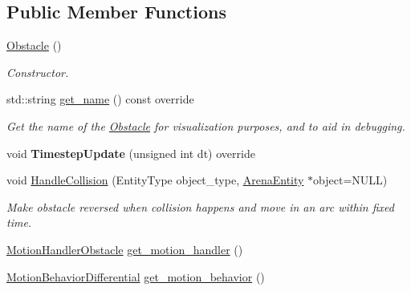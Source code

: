 \subsection*{Public Member Functions}
\begin{DoxyCompactItemize}
\item 
\hyperlink{classObstacle_a8f734072321fa06a7b7dae2d5f50f352}{Obstacle} ()\hypertarget{classObstacle_a8f734072321fa06a7b7dae2d5f50f352}{}\label{classObstacle_a8f734072321fa06a7b7dae2d5f50f352}

\begin{DoxyCompactList}\small\item\em Constructor. \end{DoxyCompactList}\item 
std\+::string \hyperlink{classObstacle_a4642d3f61b6e74fd5a9c91bb263dfe18}{get\+\_\+name} () const override\hypertarget{classObstacle_a4642d3f61b6e74fd5a9c91bb263dfe18}{}\label{classObstacle_a4642d3f61b6e74fd5a9c91bb263dfe18}

\begin{DoxyCompactList}\small\item\em Get the name of the \hyperlink{classObstacle}{Obstacle} for visualization purposes, and to aid in debugging. \end{DoxyCompactList}\item 
void {\bfseries Timestep\+Update} (unsigned int dt) override\hypertarget{classObstacle_adda549c77a5a67aa5423cb0f84b986df}{}\label{classObstacle_adda549c77a5a67aa5423cb0f84b986df}

\item 
void \hyperlink{classObstacle_aa4e6d051a5fe8024d59425737baa381f}{Handle\+Collision} (Entity\+Type object\+\_\+type, \hyperlink{classArenaEntity}{Arena\+Entity} $\ast$object=N\+U\+LL)\hypertarget{classObstacle_aa4e6d051a5fe8024d59425737baa381f}{}\label{classObstacle_aa4e6d051a5fe8024d59425737baa381f}

\begin{DoxyCompactList}\small\item\em Make obstacle reversed when collision happens and move in an arc within fixed time. \end{DoxyCompactList}\item 
\hyperlink{classMotionHandlerObstacle}{Motion\+Handler\+Obstacle} \hyperlink{classObstacle_a3733568b7023389407d9d8cea358b329}{get\+\_\+motion\+\_\+handler} ()
\item 
\hyperlink{classMotionBehaviorDifferential}{Motion\+Behavior\+Differential} \hyperlink{classObstacle_aab71c0b9c09fa1c1429b3896a7adfb7c}{get\+\_\+motion\+\_\+behavior} ()
\end{DoxyCompactItemize}
